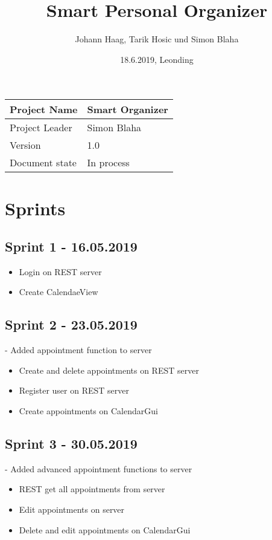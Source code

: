 \documentclass[12pt]{scrartcl}
\title{Smart Personal Organizer}
\author{Johann Haag, Tarik Hosic und Simon Blaha}
\date{18.6.2019, Leonding}
\begin{document}
    \maketitle
    \begin{flushleft}
    \begin{tabular}{|l|l|}
    \hline
    Project Name & Smart Organizer \\ \hline
    Project Leader & Simon Blaha \\ \hline
    Version & 1.0\\ \hline
    Document state & In process \\ \hline
    \end{tabular}
    \end{flushleft}

    \pagebreak
    \tableofcontents
    \pagebreak

    \section{Sprints}
    \subsection{Sprint 1 - 16.05.2019}
    \begin{itemize}
        \item Login on REST server
        \item Create CalendaeView
    \end{itemize}

    \subsection{Sprint 2 - 23.05.2019}
    - Added appointment function to server
    \begin{itemize}
        \item Create and delete appointments on REST server
        \item Register user on REST server
        \item Create appointments on CalendarGui
    \end{itemize}

    \subsection{Sprint 3 - 30.05.2019}
    - Added advanced appointment functions to server
    \begin{itemize}
        \item REST get all appointments from server
        \item Edit appointments on server
        \item Delete and edit appointments on CalendarGui
    \end{itemize}
\end{document}
